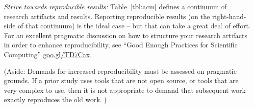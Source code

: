 \documentclass[10pt]{elsarticle}
\newcommand{\RED}{\color{black}}
\newcommand{\BLACK}{\color{black}}
\begin{document}
{\em Strive towards reproducible results:}
Table~\ref{tbl:acm} defines a continuum of research artifacts and results.  Reporting reproducible results (on the right-hand-side of that continuum) is the ideal case -- but that can take a great deal of effort.  
For an excellent pragmatic discussion on how to structure your research artifacts in order to enhance reproducibility, see ``Good Enough Practices for Scientific Computing''  \href{http://goo.gl/TD7Cax}{goo.gl/TD7Cax}.

\RED(Aside: Demands for increased reproducibility must be assessed on pragmatic grounds.  If a prior study uses tools that are not open source, or tools that are very complex to use, then it is not appropriate to demand that subsequent work exactly reproduces the old work. )\label{noreprod} \BLACK
\end{document}
